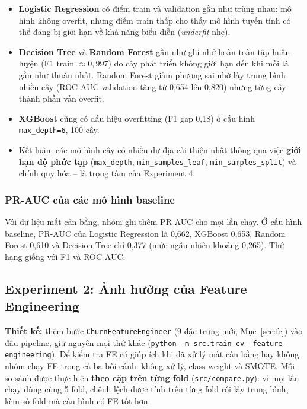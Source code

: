 \begin{itemize}
    \item \textbf{Logistic Regression} có điểm train và validation gần như trùng nhau: mô hình không overfit, nhưng điểm train thấp cho thấy mô hình tuyến tính có thể đang bị giới hạn về khả năng biểu diễn (\textit{underfit} nhẹ).
    \item \textbf{Decision Tree} và \textbf{Random Forest} gần như ghi nhớ hoàn toàn tập huấn luyện (F1 train $\approx 0{,}997$) do cây phát triển không giới hạn đến khi mỗi lá gần như thuần nhất. Random Forest giảm phương sai nhờ lấy trung bình nhiều cây (ROC-AUC validation tăng từ 0,654 lên 0,820) nhưng từng cây thành phần vẫn overfit.
    \item \textbf{XGBoost} cũng có dấu hiệu overfitting (F1 gap 0,18) ở cấu hình \texttt{max\_depth=6}, 100 cây.
    \item Kết luận: các mô hình cây có nhiều dư địa cải thiện nhất thông qua việc \textbf{giới hạn độ phức tạp} (\texttt{max\_depth}, \texttt{min\_samples\_leaf}, \texttt{min\_samples\_split}) và chính quy hóa -- là trọng tâm của Experiment 4.
\end{itemize}

\subsubsection{PR-AUC của các mô hình baseline}
Với dữ liệu mất cân bằng, nhóm ghi thêm PR-AUC cho mọi lần chạy. Ở cấu hình baseline, PR-AUC của Logistic Regression là 0,662, XGBoost 0,653, Random Forest 0,610 và Decision Tree chỉ 0,377 (mức ngẫu nhiên khoảng 0,265). Thứ hạng giống với F1 và ROC-AUC.

\subsection{Experiment 2: Ảnh hưởng của Feature Engineering}
\textbf{Thiết kế:} thêm bước \texttt{ChurnFeatureEngineer} (9 đặc trưng mới, Mục~\ref{sec:fe}) vào đầu pipeline, giữ nguyên mọi thứ khác (\texttt{python -m src.train cv --feature-engineering}). Để kiểm tra FE có giúp ích khi đã xử lý mất cân bằng hay không, nhóm chạy FE trong cả ba bối cảnh: không xử lý, class weight và SMOTE. Mỗi so sánh được thực hiện \textbf{theo cặp trên từng fold} (\texttt{src/compare.py}): vì mọi lần chạy dùng cùng 5 fold, chênh lệch được tính trên từng fold rồi lấy trung bình, kèm số fold mà cấu hình có FE tốt hơn.

